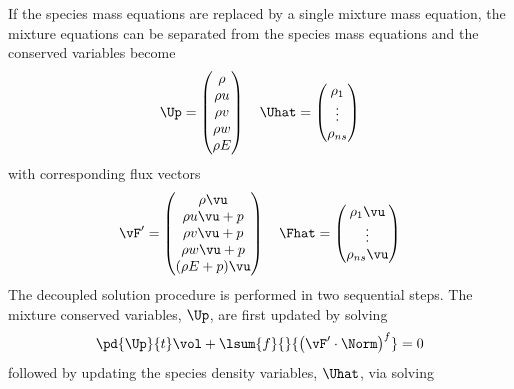 If the species mass equations are replaced by a single mixture mass equation,
the mixture equations can be separated from the species mass
equations and the conserved variables become
\begin{equation}
	\Up =
  \begin{pmatrix}
		\rho \\
		\rho u \\
		\rho v \\
		\rho w \\
		\rho E
	\end{pmatrix} \quad
	\Uhat =
  \begin{pmatrix}
		\rho_1 \\
		\vdots \\
		\rho_{ns}
  \end{pmatrix}
  \label{dc-variables}
\end{equation}
with corresponding flux vectors
\begin{equation}
 	\vF' = 
  \begin{pmatrix}
		\rho \vu \\
		\rho u\vu + p \\
		\rho v\vu + p \\
		\rho w\vu + p \\
		(\rho E + p) \vu
	\end{pmatrix} \quad
 	\Fhat = 
  \begin{pmatrix}
		\rho_1 \vu \\
		\vdots \\
		\rho_{ns} \vu
	\end{pmatrix}
  \label{dc-fluxes}
\end{equation}
The decoupled solution procedure is performed in two sequential steps.  The
mixture conserved variables, $\Up$, are first updated by solving
\begin{equation}
  \pd{\Up}{t} \vol + \lsum{f}{}{\left(\vF' \cdot \Norm\right)^f} = 0
  \label{dc-flux-part-1}
\end{equation}
followed by updating the species density variables, $\Uhat$, via solving
